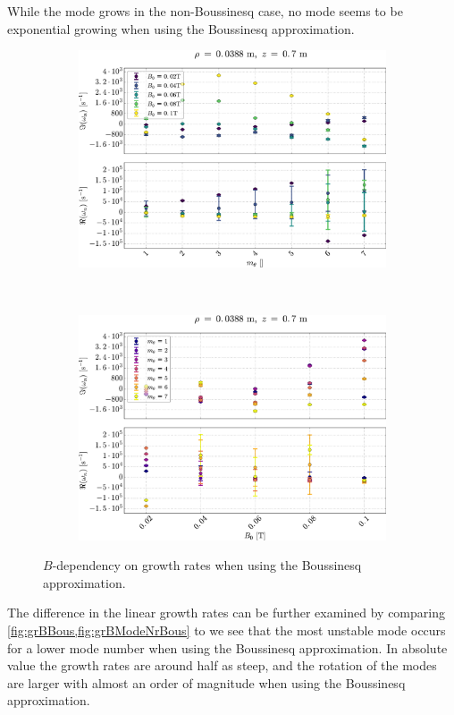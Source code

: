 %
While the  mode grows in the non-Boussinesq case, no mode seems to be exponential growing when using the Boussinesq approximation.
%
\begin{figure}[h]
    \centering
    \begin{subfigure}[h]{0.5\textwidth}
        \centering
        \includegraphics[width=1.0\textwidth]{fig/results/compareBouss/growthRatesB0Bous}
        \label{fig:grBBous}
    \end{subfigure}%
    \\
    \begin{subfigure}[h]{0.50\textwidth}
        \centering
        \includegraphics[width=1.0\textwidth]{fig/results/compareBouss/growthRatesB0ModeNr}
        \label{fig:grBModeNrBous}
    \end{subfigure}
    \caption{$B$-dependency on growth rates when using the Boussinesq approximation.}
\end{figure}
%
The difference in the linear growth rates can be further examined by comparing \cref{fig:grBBous,fig:grBModeNrBous} to
we see that the most unstable mode occurs for a lower mode number when using the Boussinesq approximation.
In absolute value the growth rates are around half as steep, and the rotation of the modes are larger with almost an order of magnitude when using the Boussinesq approximation.

